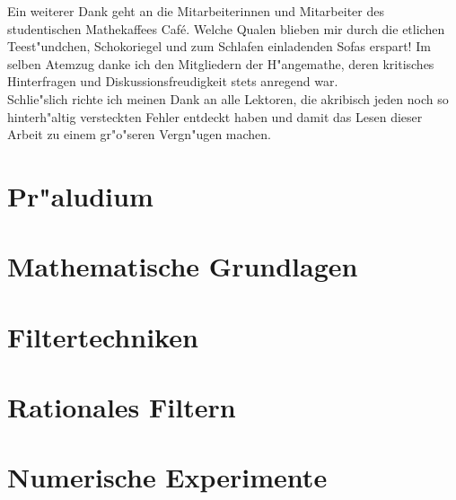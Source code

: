 \documentclass[11pt, twoside]{report} %
\begin{document}
Ein weiterer Dank geht an die Mitarbeiterinnen und Mitarbeiter des studentischen Mathekaffees  Caf\'e\grqq. Welche Qualen blieben mir durch
die etlichen Teest"undchen, Schokoriegel und zum Schlafen einladenden Sofas erspart! Im selben Atemzug
danke ich den Mitgliedern der \glqq H"angemathe\grqq, deren kritisches Hinterfragen und Diskussionsfreudigkeit stets anregend war.\\

Schlie"slich richte ich meinen Dank an alle Lektoren, die akribisch jeden noch so hinterh"altig versteckten
Fehler entdeckt haben und damit das Lesen dieser Arbeit zu einem gr"o"seren Vergn"ugen machen.\\

\tableofcontents

\chapter{Pr"aludium}%


\chapter{Mathematische Grundlagen}


\chapter{Filtertechniken} %


\chapter{Rationales Filtern}%


\chapter{Numerische Experimente}

\end{document}
